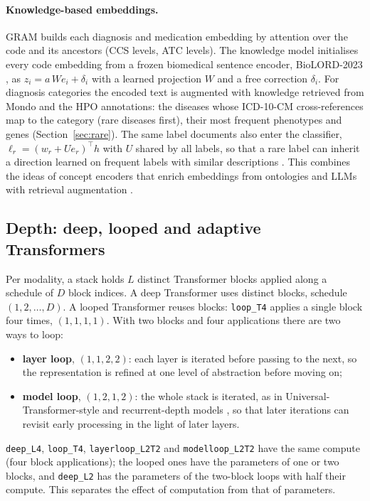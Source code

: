 \documentclass[11pt]{article}
\begin{document}
\paragraph{Knowledge-based embeddings.} GRAM \citep{choi2017gram} builds each diagnosis and medication embedding by
attention over the code and its ancestors (CCS levels, ATC levels). The knowledge model initialises every code
embedding from a frozen biomedical sentence encoder, BioLORD-2023 \citep{remy2024biolord}, as
$z_i = a\,W e_i + \delta_i$ with a learned projection $W$ and a free correction $\delta_i$. For diagnosis
categories the encoded text is augmented with knowledge retrieved from Mondo and the HPO annotations: the diseases
whose ICD-10-CM cross-references map to the category (rare diseases first), their most frequent phenotypes and
genes (Section~\ref{sec:rare}). The same label documents also enter the classifier, $\ell_r=(w_r+Ue_r)^\top h$
with $U$ shared by all labels, so that a rare label can inherit a direction learned on frequent labels with
similar descriptions \citep{rios2018fewshot}. This combines the ideas of concept encoders that enrich embeddings
from ontologies and LLMs \citep{linko2025,medco2026,jiang2024graphcare,hegselmann2025} with retrieval
augmentation \citep{xu2024ramehr,jiang2025kare}.

\subsection{Depth: deep, looped and adaptive Transformers}

Per modality, a stack holds $L$ distinct Transformer blocks applied along a schedule of $D$ block indices. A deep
Transformer uses distinct blocks, schedule $(1,2,\dots,D)$. A looped Transformer reuses blocks: \texttt{loop\_T4}
applies a single block four times, $(1,1,1,1)$. With two blocks and four applications there are two ways to loop:
\begin{itemize}
\item \textbf{layer loop}, $(1,1,2,2)$: each layer is iterated before passing to the next, so the representation
is refined at one level of abstraction before moving on;
\item \textbf{model loop}, $(1,2,1,2)$: the whole stack is iterated, as in Universal-Transformer-style and
recurrent-depth models \citep{dehghani2019universal,geiping2025recurrent}, so that later iterations can revisit
early processing in the light of later layers.
\end{itemize}
\texttt{deep\_L4}, \texttt{loop\_T4}, \texttt{layerloop\_L2T2} and \texttt{modelloop\_L2T2} have the same compute
(four block applications); the looped ones have the parameters of one or two blocks, and \texttt{deep\_L2} has the
parameters of the two-block loops with half their compute. This separates the effect of computation from that of
parameters.
\end{document}
